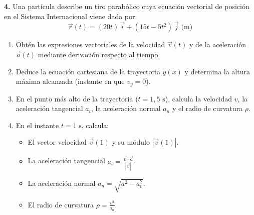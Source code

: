 \documentclass[11pt,a4paper]{article}
\begin{document}
\vspace{0.6cm}
\noindent\textbf{4.} Una partícula describe un tiro parabólico cuya ecuación vectorial de posición en el Sistema Internacional viene dada por:
\[
\vec{r}(t) = (20t)\,\vec{i} + (15t - 5t^2)\,\vec{j}\text{ (m)}
\]
\begin{enumerate}[label=\textbf{\alph*)}, leftmargin=2em, itemsep=6pt]
    \item Obtén las expresiones vectoriales de la velocidad $\vec{v}(t)$ y de la aceleración $\vec{a}(t)$ mediante derivación respecto al tiempo.
    \item Deduce la ecuación cartesiana de la trayectoria $y(x)$ y determina la altura máxima alcanzada (instante en que $v_y = 0$).
    \item En el punto más alto de la trayectoria ($t = 1{,}5\text{ s}$), calcula la velocidad $v$, la aceleración tangencial $a_t$, la aceleración normal $a_n$ y el radio de curvatura $\rho$.
    \item En el instante $t = 1\text{ s}$, calcula:
    \begin{itemize}[leftmargin=1.5em, itemsep=3pt]
        \item El vector velocidad $\vec{v}(1)$ y su módulo $|\vec{v}(1)|$.
        \item La aceleración tangencial $a_t = \frac{\vec{v} \cdot \vec{a}}{|\vec{v}|}$.
        \item La aceleración normal $a_n = \sqrt{a^2 - a_t^2}$.
        \item El radio de curvatura $\rho = \frac{v^2}{a_n}$.
    \end{itemize}
\end{enumerate}
\end{document}
